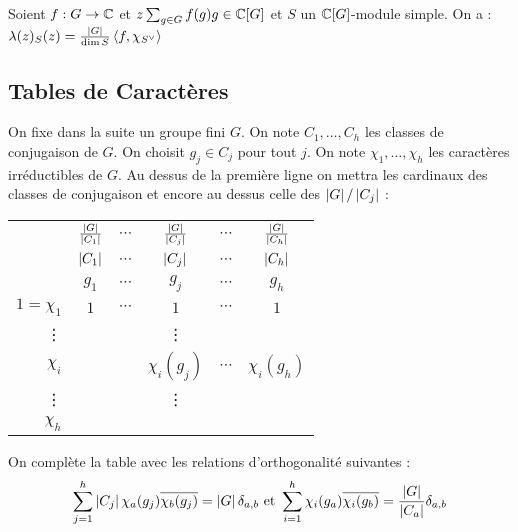 \documentclass{cours}
\begin{document}
\begin{lemma}
    Soient $f : G \rightarrow \mathbb{C}$ et $z \sum_{g \in G}f(g)g \in \mathbb{C}[G]$ et $S$ un $\mathbb{C}[G]$-module simple. On a : $\lambda(z)_{S}(z) = \frac{\left|G\right|}{\dim S}\left\langle f, \chi_{S^{\lor}} \right\rangle$
\end{lemma}

\subsection{Tables de Caractères}
\begin{definition}
    On fixe dans la suite un groupe fini $G$. On note $C_{1}, \ldots, C_{h}$ les classes de conjugaison de $G$. On choisit $g_{j} \in C_{j}$ pour tout $j$. On note $\chi_{1}, \ldots, \chi_{h}$ les caractères irréductibles de $G$. Au dessus de la première ligne on mettra les cardinaux des classes de conjugaison et encore au dessus celle des $\left|G\right|/\left|C_{j}\right|$ :
    \begin{center}
        \begin{tabular}{r|ccccc}
                           & $\frac{\left|G\right|}{\left|C_{1}\right|}$ & $\cdots$ & $\frac{\left|G\right|}{\left|C_{j}\right|}$ & $\cdots$ & $\frac{\left|G\right|}{\left|C_{h}\right|}$ \\
                           & $\left|C_{1}\right|$                 & $\cdots$ & $\left|C_{j}\right|$                 & $\cdots$ & $\left|C_{h}\right|$                 \\
                           & $g_{1}$                       & $\cdots$ & $g_{j}$                       & $\cdots$ & $g_{h}$                       \\
            \midrule
            $1 = \chi_{1}$ & $1$                           & $\cdots$ & $1$                           & $\cdots$ & $1$                           \\
            \vdots         &                               &          & \vdots                        &          &                               \\
            $\chi_{i}$     &                               &          & $\chi_{i}(g_{j})$             & $\cdots$ & $\chi_{i}(g_{h})$             \\
            \vdots         &                               &          & \vdots                        &          &                               \\
            $\chi_{h}$     &                               &          &                               &          &
        \end{tabular}
    \end{center}
    On complète la table avec les relations d'orthogonalité suivantes :
    \[
        \sum_{j = 1}^{h}\left|C_{j}\right|\chi_{a}(g_{j})\overline{\chi_{b}(g_{j})} = \left|G\right|\delta_{a, b} \text{ et } \sum_{i = 1}^{h}\chi_{i}(g_{a})\overline{\chi_{i}(g_{b})} = \frac{\left|G\right|}{\left|C_{a}\right|}\delta_{a, b}
    \]
\end{definition}
\end{document}
